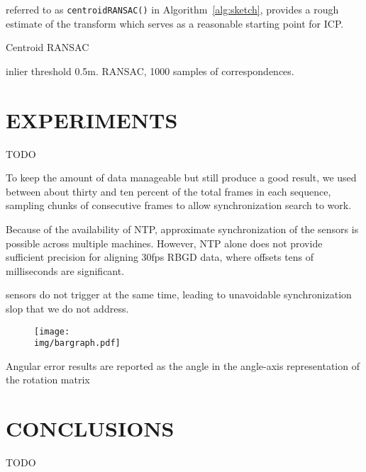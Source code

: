 \documentclass[letterpaper, 10 pt, conference]{ieeeconf}  %
\newcommand{\img}{img}
\begin{document}
referred to as \texttt{centroidRANSAC()} in Algorithm~\ref{alg:sketch}, provides a rough estimate of the transform which serves as a reasonable starting point for ICP.


\begin{algorithm}
  \caption{Centroid RANSAC}
  \label{alg:cal}
  \SetLine
  \phantom{\;}
  inlier threshold 0.5m.  RANSAC, 1000 samples of correspondences.
\end{algorithm}



\section{EXPERIMENTS}
TODO

To keep the amount of data manageable but still produce a good result, we used between about thirty and ten percent of the total frames in each sequence, sampling chunks of consecutive frames to allow synchronization search to work.

Because of the availability of NTP, approximate synchronization of the sensors is possible across multiple machines.  However, NTP alone does not provide sufficient precision for aligning 30fps RBGD data, where offsets tens of milliseconds are significant.


sensors do not trigger at the same time, leading to unavoidable synchronization slop that we do not address.



\begin{figure}
  \centering
  \texttt{[image: \\img/bargraph.pdf]}
  \caption{}
  \label{fig:bargraph}
\end{figure}

\begin{figure}
  \centering
  
  \label{fig:results}
\end{figure}

Angular error results are reported as the angle in the angle-axis representation of the rotation matrix 

\section{CONCLUSIONS}
TODO



\end{document}
